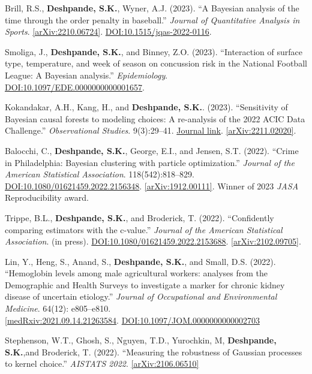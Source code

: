 \documentclass[margin]{res}
\def\skd{\textbf{Deshpande, S.K.}}
\begin{document}
\begin{resume}
Brill, R.S., \skd, Wyner, A.J. (2023). ``A Bayesian analysis of the time through the order penalty in baseball.'' \textit{Journal of Quantitative Analysis in Sports}. \href{https://arxiv.org/abs/2210.06724}{[arXiv:2210.06724]}. \href{https://doi.org/10.1515/jqas-2022-0116}{DOI:10.1515/jqas-2022-0116}.

Smoliga, J., \skd, and Binney, Z.O. (2023). ``Interaction of surface type, temperature, and week of season on concussion risk in the National Football League: A {Bayesian} analysis.'' \textit{Epidemiology}. \href{https://doi.org/10.1097/EDE.0000000000001657}{DOI:10.1097/EDE.0000000000001657}.

Kokandakar, A.H., Kang, H., and \skd. (2023). ``Sensitivity of Bayesian causal forests to modeling choices: A re-analysis of the 2022 ACIC Data Challenge.'' \textit{Observational Studies}. 9(3):29--41. \href{https://muse.jhu.edu/pub/56/article/895651}{Journal link}. \href{https://arxiv.org/abs/2211.02020}{[arXiv:2211.02020]}.

Balocchi, C., \skd, George, E.I., and Jensen, S.T. (2022). ``Crime in Philadelphia: Bayesian clustering with particle optimization.'' \textit{Journal of the American Statistical Association}. 118(542):818--829.
\href{https://doi.org/10.1080/01621459.2022.2156348}{DOI:10.1080/01621459.2022.2156348}. \href{https://arxiv.org/abs/1912.00111}{[arXiv:1912.00111]}. Winner of 2023 \textit{JASA} Reproducibility award.

Trippe, B.L., \skd, and Broderick, T. (2022). ``Confidently comparing estimators with the c-value.'' \textit{Journal of the American Statistical Association}. (in press). \href{https://doi.org/10.1080/01621459.2022.2153688}{DOI:10.1080/01621459.2022.2153688}. \href{https://arxiv.org/abs/2102.09705}{[arXiv:2102.09705]}. 

Lin, Y., Heng, S., Anand, S., \skd, and Small, D.S. (2022). ``Hemoglobin levels among male agricultural workers: analyses from the Demographic and Health Surveys to investigate a marker for chronic kidney disease of uncertain etiology.'' \textit{Journal of Occupational and Environmental Medicine}. 64(12): e805--e810. \\ \href{https://www.medrxiv.org/content/10.1101/2021.09.14.21263584v2}{[medRxiv:2021.09.14.21263584}. \href{https://doi.org/10.1097/JOM.0000000000002703}{DOI:10.1097/JOM.0000000000002703}

Stephenson, W.T., Ghosh, S., Nguyen, T.D., Yurochkin, M, \skd,and Broderick, T. (2022). ``Measuring the robustness of Gaussian processes to kernel choice.'' \textit{AISTATS 2022}. \href{https://arxiv.org/abs/2106.06510}{[arXiv:2106.06510]}


\end{resume}
\end{document}
